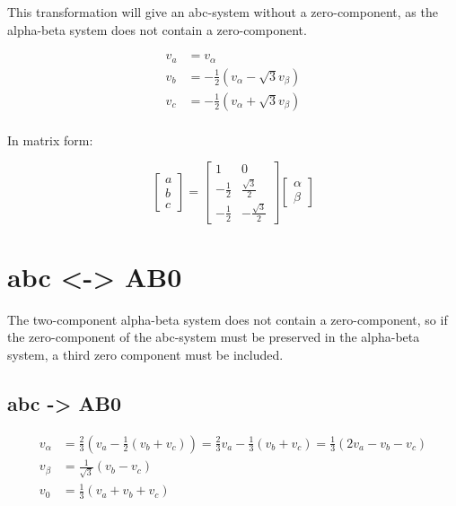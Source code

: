 \documentclass[]{book}
\begin{document}
This transformation will give an abc-system without a zero-component, as the alpha-beta system does not contain a zero-component.

\[
\begin{aligned}
v_a &= v_\alpha \\
v_b &=  - \frac{1}{2}(v_\alpha -\sqrt{3}v_\beta) \\
v_c &=  - \frac{1}{2}(v_\alpha +\sqrt{3}v_\beta) \\
\end{aligned}
\label{eq:transABabc1}
\]

In matrix form:

\[
\begin{bmatrix} a\\ b \\ c \end{bmatrix}
= \begin{bmatrix} 1 & 0 \\ -\frac{1}{2} & \frac{\sqrt{3}}{2} \\ -\frac{1}{2} & -\frac{\sqrt{3}}{2} \end{bmatrix}
\begin{bmatrix} \alpha\\ \beta \end{bmatrix}
\label{eq:transABabc2}
\]

\hypertarget{abc---ab0}{%
\section{abc \textless{}-\textgreater{} AB0}\label{abc---ab0}}

The two-component alpha-beta system does not contain a zero-component, so if the zero-component of the abc-system must be preserved in the alpha-beta system, a third zero component must be included.

\hypertarget{abc---ab0-1}{%
\subsection{abc -\textgreater{} AB0}\label{abc---ab0-1}}

\[
\begin{aligned}
v_\alpha &= \frac{2}{3}(v_a - \frac{1}{2}(v_b+v_c)) = \frac{2}{3}v_a - \frac{1}{3}(v_b+v_c) = \frac{1}{3} ( 2 v_a - v_b-v_c)\\
v_\beta &= \frac{1}{\sqrt{3}}(v_b-v_c)  \\
v_0 &= \frac{1}{3}(v_a+v_b+v_c)
\end{aligned}
\label{eq:transabcAB01}
\]
\end{document}

